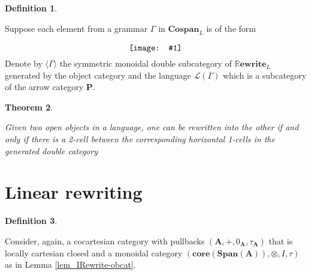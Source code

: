 \documentclass{amsart}
\newcommand{\A}{\cat{A}}
\renewcommand{\P}{\cat{P}}
\newcommand{\core}{\mathbf{core}}
\newcommand{\cat}[1]{\mathbf{#1}}
\newcommand{\diagram}[1]{\raisebox{-0.5\height}{\texttt{[image: \#1]}}}
\newcommand{\Span}{\mathbf{Span}}
\newcommand{\Cospan}{\mathbf{Cospan}}
\newcommand{\RRewrite}{ \mathbb{R}\mathbf{ewrite} }
\newtheorem{theorem}{Theorem}[section]
\theoremstyle{remark}
\theoremstyle{definition}
\newtheorem{definition}[theorem]{Definition}
\begin{document}
\begin{definition}
  \label{df:nl_gramr-gen-dblcat}
	
  Suppose each element from a grammar $ \Gamma $ in $ \Cospan_{L} $ is
  of the form
  \[
    \diagram{diag_nlr-grammar-2cell}
  \]
  Denote by $ \langle \Gamma \rangle $ the symmetric monoidal double
  subcategory of $ \RRewrite_{L} $ generated by the object category
  and the language $ \mathcal{L} ( \Gamma ) $ which is a subcategory
  of the arrow category $ \P $.
        
\end{definition}

\begin{theorem}
  \label{thm:nl_rewr-iff-2cell}
  
  Given two open objects in a language, one can be rewritten into the
  other if and only if there is a 2-cell between the corresponding
  horizontal 1-cells in the generated double category
  
\end{theorem}



\section{Linear rewriting} \label{sec:linear-rewriting}




\begin{definition}
  \label{def:mon-rewrite-obcat}
 
  Consider, again, a cocartesian category with pullbacks
  $ (\A , + , 0_{\A} , \tau_\A ) $
  that is locally cartesian closed and a monoidal category
  $ ( \core ( \Span ( \A )) , \otimes , I , \tau )$
  as in Lemma \ref{lem_IRewrite-obcat}.
  
\end{definition}
\end{document}
